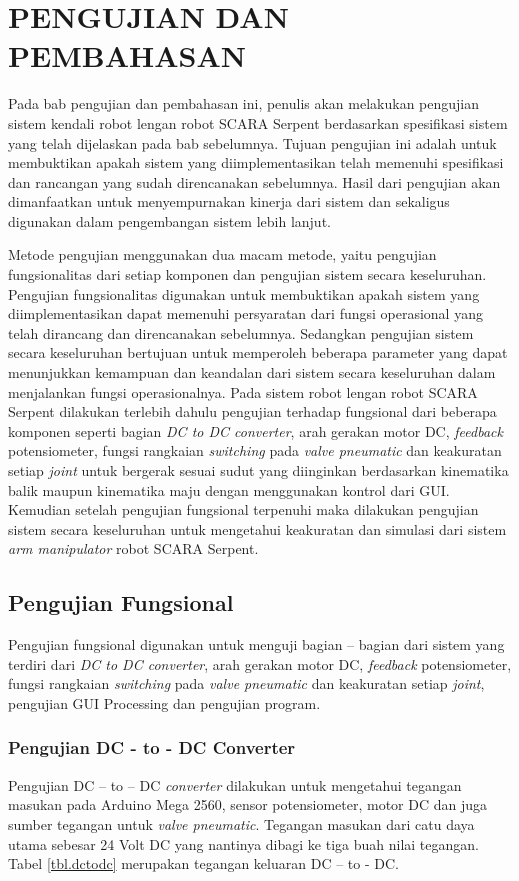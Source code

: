 
\chapter{PENGUJIAN DAN PEMBAHASAN}
Pada bab pengujian dan pembahasan ini, penulis akan melakukan pengujian sistem kendali robot lengan robot SCARA Serpent berdasarkan spesifikasi sistem yang telah dijelaskan pada bab sebelumnya. Tujuan pengujian ini adalah untuk membuktikan apakah sistem yang diimplementasikan telah memenuhi spesifikasi dan rancangan yang sudah direncanakan sebelumnya. Hasil dari pengujian akan dimanfaatkan untuk menyempurnakan kinerja dari sistem dan sekaligus digunakan dalam pengembangan sistem lebih lanjut. 

Metode pengujian menggunakan dua macam metode, yaitu pengujian fungsionalitas dari setiap komponen dan pengujian sistem secara keseluruhan. Pengujian fungsionalitas digunakan untuk membuktikan apakah sistem yang diimplementasikan dapat memenuhi persyaratan dari fungsi operasional yang telah dirancang dan direncanakan sebelumnya. Sedangkan pengujian sistem secara keseluruhan bertujuan untuk memperoleh beberapa parameter yang dapat menunjukkan kemampuan dan keandalan dari sistem secara keseluruhan dalam menjalankan fungsi operasionalnya. Pada sistem robot lengan robot SCARA Serpent dilakukan terlebih dahulu pengujian terhadap fungsional dari beberapa komponen seperti bagian \textit{DC to DC converter}, arah gerakan motor DC, \textit{feedback} potensiometer, fungsi rangkaian \textit{switching} pada \textit{valve pneumatic} dan keakuratan setiap \textit{joint} untuk bergerak sesuai sudut yang diinginkan berdasarkan kinematika balik maupun kinematika maju dengan menggunakan kontrol dari GUI.  Kemudian setelah pengujian fungsional terpenuhi maka dilakukan pengujian sistem secara keseluruhan untuk mengetahui keakuratan dan simulasi dari sistem \textit{arm manipulator} robot SCARA Serpent.

\section{Pengujian Fungsional}
Pengujian fungsional digunakan untuk menguji bagian – bagian dari sistem yang terdiri dari \textit{DC to DC converter}, arah gerakan motor DC, \textit{feedback} potensiometer, fungsi rangkaian \textit{switching} pada \textit{valve pneumatic} dan keakuratan setiap \textit{joint}, pengujian GUI Processing dan pengujian program. 

\subsection{Pengujian DC - to - DC Converter}
Pengujian DC – to – DC \textit{converter} dilakukan untuk mengetahui tegangan masukan pada Arduino Mega 2560, sensor potensiometer, motor DC dan juga sumber tegangan untuk\textit{ valve pneumatic}. Tegangan masukan dari catu daya utama sebesar 24 Volt DC yang nantinya dibagi ke tiga buah nilai tegangan. Tabel \ref{tbl.dctodc} merupakan tegangan keluaran DC – to - DC.

